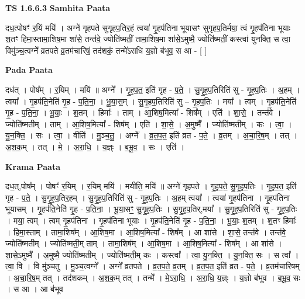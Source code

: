 \documentclass[17pt]{extarticle}
\begin{document}
\textbf{TS 1.6.6.3 } \newline
\textbf{Samhita Paata} \newline

दध॒त्पोषꣳ॑ र॒यिं मयि॑ । अग्ने॑ गृहपते सुगृहप॒तिर॒हं त्वया॑ गृ॒हप॑तिना भूयासꣳ सुगृहप॒तिर्मया॒ त्वं गृ॒हप॑तिना भूयाः श॒तꣳ हिमा॒स्तामा॒शिष॒मा शा॑से॒ तन्त॑वे॒ ज्योति॑ष्मतीं॒ तामा॒शिष॒मा शा॑से॒ऽमुष्मै॒ ज्योति॑ष्मतीं॒ कस्त्वा॑ युनक्ति॒ स त्वा॒ विमु॑ञ्च॒त्वग्ने᳚ व्रतपते व्र॒तम॑चारिषं॒ तद॑शकं॒ तन्मे॑ऽराधि य॒ज्ञो ब॑भूव॒ स आ - [ ] \newline

\textbf{Pada Paata} \newline

दध॑त् । पोष᳚म् । र॒यिम् । मयि॑ ॥ अग्ने᳚ । गृ॒ह॒प॒त॒ इति॑ गृह - प॒ते॒ । सु॒गृ॒ह॒प॒तिरिति॑ सु - गृ॒ह॒प॒तिः । अ॒हम् । त्वया᳚ । गृ॒हप॑ति॒नेति॑ गृ॒ह - प॒ति॒ना॒ । भू॒या॒स॒म् । सु॒गृ॒ह॒प॒तिरिति॑ सु – गृ॒ह॒प॒तिः  । मया᳚ । त्वम् । गृ॒हप॑ति॒नेति॑ गृ॒ह - प॒ति॒ना॒ । भू॒याः॒ । श॒तम् । हिमाः᳚ । ताम् । आ॒शिष॒मित्या᳚ - शिष᳚म् । एति॑ । शा॒से॒ । तन्त॑वे । ज्योति॑ष्मतीम् । ताम् । आ॒शिष॒मित्या᳚ - शिष᳚म् । एति॑ । शा॒से॒ । अ॒मुष्मै᳚ । ज्योति॑ष्मतीम् । कः । त्वा॒ । यु॒न॒क्ति॒ । सः । त्वा॒ । वीति॑ । मु॒ञ्च॒तु॒ । अग्ने᳚ । व्र॒त॒प॒त॒ इति॑ व्रत - प॒ते॒ । व्र॒तम् । अ॒चा॒रि॒ष॒म् । तत् । अ॒श॒क॒म् । तत् । मे॒ । अ॒रा॒धि॒ । य॒ज्ञ्ः । ब॒भू॒व॒ । सः । एति॑ ।  \newline


\textbf{Krama Paata} \newline

दध॒त्,पोष᳚म् । पोषꣳ॑ र॒यिम् । र॒यिम् मयि॑ । मयीति॒ मयि॑ ॥ अग्ने॑ गृहपते । गृ॒ह॒प॒ते॒ सु॒गृ॒ह॒प॒तिः । गृ॒ह॒प॒त॒ इति॑ गृह - प॒ते॒ । सु॒गृ॒ह॒प॒तिर॒हम् । सु॒गृ॒ह॒प॒तिरिति॑ सु - गृ॒ह॒प॒तिः । अ॒हम् त्वया᳚ । त्वया॑ गृ॒हप॑तिना । गृ॒हप॑तिना भूयासम् । गृ॒हप॑ति॒नेति॑ गृ॒ह - प॒ति॒ना॒ । भू॒या॒सꣳ॒॒ सु॒गृ॒ह॒प॒तिः । सु॒गृ॒ह॒प॒तिर्,मया᳚ । सु॒गृ॒ह॒प॒तिरिति॑ सु - गृ॒ह॒प॒तिः । मया॒ त्वम् । त्वम् गृ॒हप॑तिना । गृ॒हप॑तिना भूयाः । गृ॒हप॑ति॒नेति॑ गृ॒ह - प॒ति॒ना॒ । भू॒याः॒ श॒तम् । श॒तꣳ हिमाः᳚ । हिमा॒स्ताम् । तामा॒शिष᳚म् । आ॒शिष॒मा । आ॒शिष॒मित्या᳚ - शिष᳚म् । आ शा॑से । शा॒से॒ तन्त॑वे । तन्त॑वे॒ ज्योति॑ष्मतीम् । ज्योति॑ष्मती॒म् ताम् । तामा॒शिष᳚म् । आ॒शिष॒मा । आ॒शिष॒मित्या᳚ - शिष᳚म् । आ शा॑से । शा॒से॒ऽमुष्मै᳚ । अ॒मुष्मै॒ ज्योति॑ष्मतीम् । ज्योति॑ष्मती॒म् कः । कस्त्वा᳚ । त्वा॒ यु॒न॒क्ति॒ । यु॒न॒क्ति॒ सः । स त्वा᳚ । त्वा॒ वि । वि मु॑ञ्चतु । मु॒ञ्च॒त्वग्ने᳚ । अग्ने᳚ व्रतपते । व्र॒त॒प॒ते॒ व्र॒तम् । व्र॒त॒प॒त॒ इति॑ व्रत - प॒ते॒ । व्र॒तम॑चारिषम् । अ॒चा॒रि॒ष॒म् तत् । तद॑शकम् । अ॒श॒क॒म् तत् । तन्मे᳚ । मे॒ऽरा॒धि॒ । अ॒रा॒धि॒ य॒ज्ञ्ः । य॒ज्ञो ब॑भूव । ब॒भू॒व॒ सः । स आ । आ ब॑भूव \newline
\end{document}
